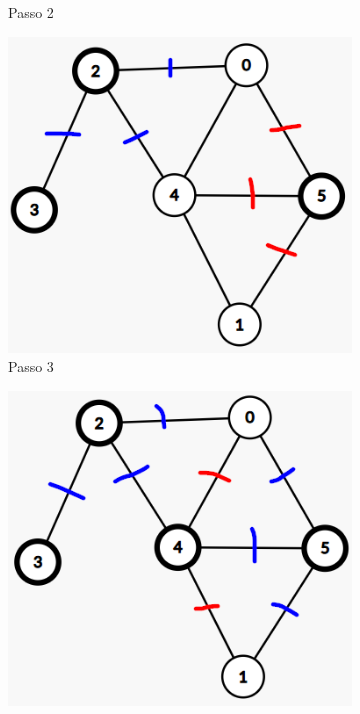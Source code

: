 \documentclass{article}  %
\theoremstyle{definition}
\begin{document}
\begin{figure}[h]
\begin{subfigure}[b]{0.24\textwidth}
		\caption{Passo 2}
	\end{subfigure}
	\hfill
	\begin{subfigure}[b]{0.24\textwidth}
		\centering
		\includegraphics[width=\textwidth]{vc3.png}
		\caption{Passo 3}
	\end{subfigure}
	\hfill
	\begin{subfigure}[b]{0.24\textwidth}
		\centering
		\includegraphics[width=\textwidth]{vc4.png}

\end{subfigure}
\end{figure}
\end{document}

